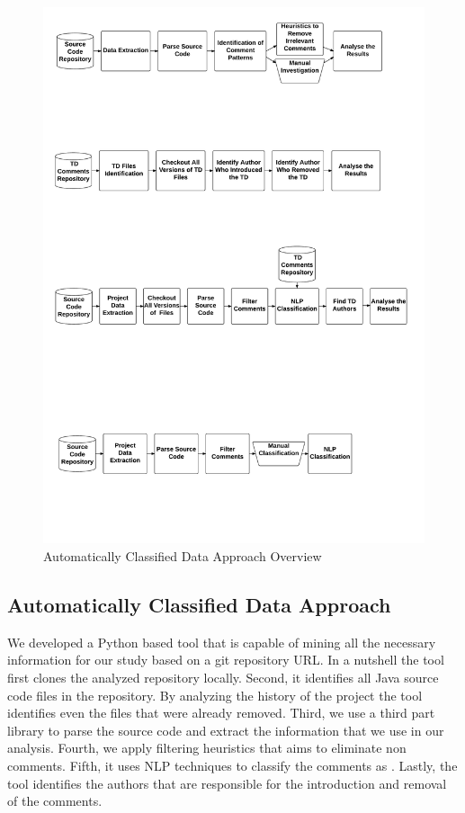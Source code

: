 \begin{figure}[thb!]
  \centering
  \includegraphics[width=1\textwidth]{figures/automatically_classified_data_approach.pdf}
  \caption{Automatically Classified Data Approach Overview}
  \label{fig:automatically_classified_data_approach_overview}
\end{figure}

\subsection*{Automatically Classified Data Approach}
\label{sub:automatically_classified_data_approach}

We developed a Python based tool that is capable of mining all the necessary information for our study based on a git repository URL. In a nutshell the tool first clones the analyzed repository locally. Second, it identifies all Java source code files in the repository. By analyzing the history of the project the tool identifies even the files that were already removed. Third, we use a third part library to parse the source code and extract the information that we use in our analysis. Fourth, we apply filtering heuristics that aims to eliminate non \SATD comments. Fifth, it uses NLP techniques to classify the comments as \SATD. Lastly, the tool identifies the authors that are responsible for the introduction and removal of the \SATD comments. 

